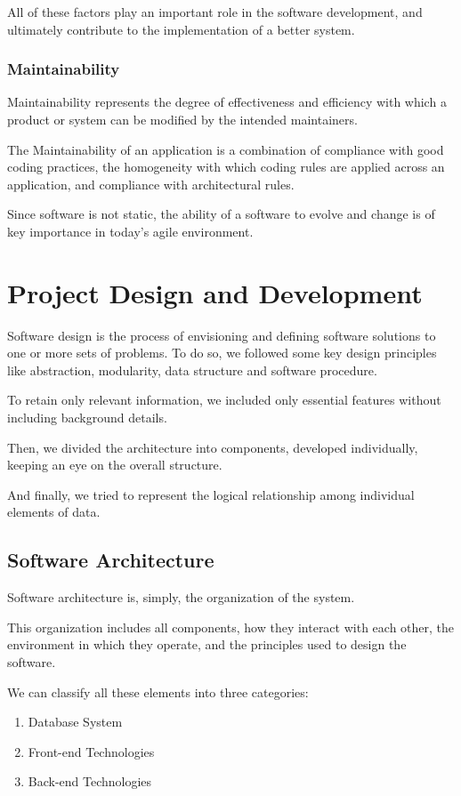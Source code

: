 \documentclass[11pt,a4paper]{article}
\begin{document}
All of these factors play an important role in the software development, and ultimately contribute to the implementation of a better system. 

\subsubsection{Maintainability}
Maintainability represents the degree of effectiveness and efficiency with which a product or system can be modified by the intended maintainers. 

The Maintainability of an application is a combination of compliance with good coding practices, the homogeneity with which coding rules are applied across an application, and compliance with architectural rules.

Since software is not static, the ability of a software to evolve and change is of key importance in today's agile environment.

\section{Project Design and Development}
Software design is the process of envisioning and defining software solutions to one or more sets of problems.
%
To do so, we followed some key design principles like abstraction, modularity, data structure and software procedure.

To retain only relevant information, we included only essential features without including background details.

Then, we divided the architecture into components, developed individually, keeping an eye on the overall structure.

And finally, we tried to represent the logical relationship among individual elements of data.

\subsection{Software Architecture}
Software architecture is, simply, the organization of the system. 

This organization includes all components, how they interact with each other, the environment in which they operate, and the principles used to design the software.

We can classify all these elements into three categories:

\begin{enumerate}
    \item Database System
    \item Front-end Technologies
    \item Back-end Technologies
\end{enumerate}
\end{document}
